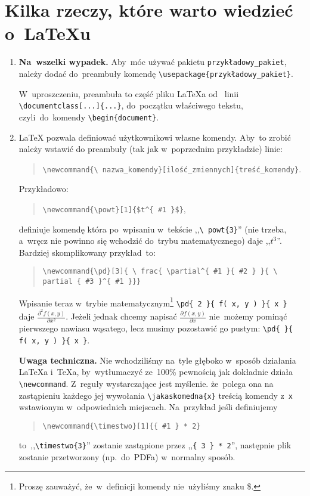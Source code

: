 \documentclass[a4paper,11pt]{article}
\newcommand{\tbs}{\textbackslash}  %
\newcommand{\tb}{\textbf}
\newcommand{\powt}[1]{$t^{ #1 }$}
\newcommand{\pd}[3]{ \frac{ \partial^{ #1 } { #2 } }
  { \partial { #3 }^{ #1 } } }
\begin{document}
\section{Kilka rzeczy, które warto wiedzieć o~\LaTeX u}
\label{sec:kilkarzeczy}

\begin{enumerate}
\item \tb{Na~wszelki wypadek.} Aby~móc używać pakietu
  \texttt{przykładowy\_pakiet}, należy dodać do~preambuły komendę
  \texttt{\tbs usepackage\{przykładowy\_pakiet\}}.

  W~uproszczeniu, preambuła to część pliku \LaTeX a od~ linii
  \texttt{\tbs documentclass[...]\{...\}}, do~początku właściwego
  tekstu, czyli~do~komendy \texttt{\tbs begin\{document\}}.
\item \LaTeX{} pozwala definiować użytkownikowi własne komendy. Aby~to
  zrobić należy wstawić do preambuły (tak jak w~poprzednim
  przykładzie) linie:
  \begin{quote}
    \texttt{\tbs newcommand\{\tbs
      nazwa\_komendy\}[ilość\_zmiennych]\{treść\_komendy\}}.
  \end{quote}
  Przykładowo:
  \begin{quote}
    \texttt{\tbs newcommand\{\tbs powt\}}\verb+[1]{$t^{ #1 }$}+,
  \end{quote}
  definiuje komendę która po~wpisaniu w~tekście ,,\texttt{\tbs
    powt\{3\}}'' (nie trzeba, a~wręcz nie powinno się wchodzić
  do~trybu matematycznego) daje ,,\powt{3}''. Bardziej skomplikowany
  przykład~to:
  \begin{quote}
    \texttt{\tbs newcommand\{\tbs pd\}}\verb+[3]+\texttt{\{ \tbs
      frac\{ \tbs partial\^{}\{ \#1 \}\{ \#2 \} \}}\texttt{\{ \tbs
      partial \{ \#3 \}\^{}\{ \#1 \}\}\}}
  \end{quote}
  Wpisanie teraz w~trybie matematycznym\footnote{Proszę zauważyć,
    że~w~definicji komendy nie~użyliśmy znaku \$.} \texttt{\tbs pd\{ 2
    \}\{ f( x, y ) \}\{ x \}} daje $\pd{ 2 }{ f( x, y ) }{ x }$.
  Jeżeli jednak chcemy napisać $\pd{}{ f( x, y ) }{ x }$ nie~możemy
  pominąć pierwszego nawiasu wąsatego, lecz musimy pozostawić go
  pustym: \texttt{\tbs pd\{ \}\{ f( x, y ) \}\{ x \}}.

  \textbf{Uwaga techniczna.} Nie wchodziliśmy na~tyle głęboko w~sposób
  działania \LaTeX a i~\TeX a, by~wytłumaczyć ze~100\% pewnością jak
  dokładnie działa \texttt{\tbs newcommand}. Z~reguły wystarczające
  jest myślenie. że~polega ona na zastąpieniu każdego jej wywołania
  \texttt{\tbs jakaskomedna\{x\}} treścią komendy z~\texttt{x}
  wstawionym w~odpowiednich miejscach. Na~przykład jeśli definiujemy
  \begin{quote}
    \texttt{\tbs newcommand\{\tbs timestwo\}[1]\{\{ \#1 \} * 2\}}
  \end{quote}
  to~,,\texttt{\tbs timestwo\{3\}}'' zostanie zastąpione przez
  ,,\texttt{\{ 3 \} * 2}'', następnie plik zostanie przetworzony
  (np.~do~PDFa) w~normalny sposób.


\end{enumerate}
\end{document}
